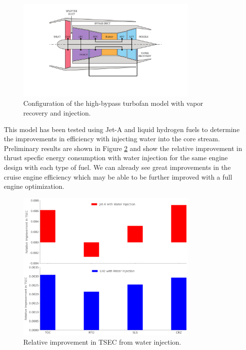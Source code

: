 \documentclass[conf]{new-aiaa}
\begin{document}
\begin{figure}[H]
	\centering
	\includegraphics[width=0.8\textwidth]{turbofan_wvr.pdf}
	\caption{Configuration of the high-bypass turbofan model with vapor recovery and injection.}
	\label{fig:hbtf_cycle}
\end{figure}

This model has been tested using Jet-A and liquid hydrogen fuels to determine the improvements in efficiency with injecting water into the core stream.
Preliminary results are shown in Figure \ref{fig:results} and show the relative improvement in thrust specfic energy consumption with water injection for the same engine design with each type of fuel.
We can already see great improvements in the cruise engine efficiency which may be able to be further improved with a full engine optimization.

\begin{figure}[H]
	\centering
	\includegraphics[width=0.8\textwidth]{JetA-H2_bar_chart_diff.png}
	\caption{Relative improvement in TSEC from water injection.}
	\label{fig:results}
\end{figure}
\end{document}
